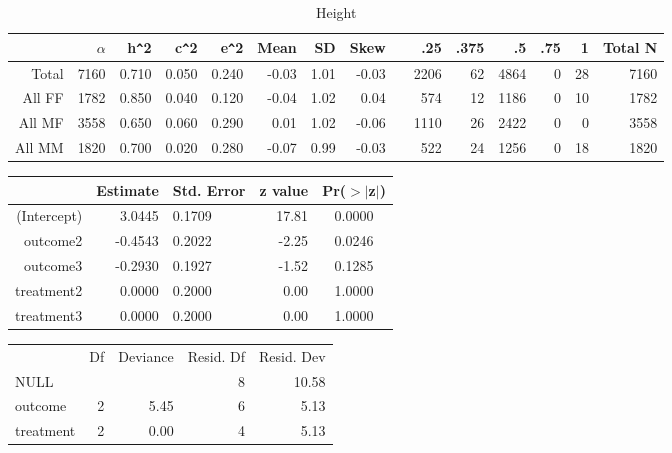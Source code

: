 \documentclass[a4paper]{article}
\begin{document}
\begin{table}[ht]
\begin{center}
\begin{tabular}{rrrrrrrrrrrrrrr}
  \hline
 & $\alpha$ & h\verb|^|2 & c\verb|^|2 & e\verb|^|2 & Mean & SD & Skew &   & .25 & .375 & .5 & .75 & 1 & Total N \\ 
  \hline
Total & 7160 & 0.710 & 0.050 & 0.240 & -0.03 & 1.01 & -0.03 &  & 2206 & 62 & 4864 & 0 & 28 & 7160 \\ 
  All FF & 1782 & 0.850 & 0.040 & 0.120 & -0.04 & 1.02 & 0.04 &  & 574 & 12 & 1186 & 0 & 10 & 1782 \\ 
  All MF & 3558 & 0.650 & 0.060 & 0.290 & 0.01 & 1.02 & -0.06 &  & 1110 & 26 & 2422 & 0 & 0 & 3558 \\ 
  All MM & 1820 & 0.700 & 0.020 & 0.280 & -0.07 & 0.99 & -0.03 &  & 522 & 24 & 1256 & 0 & 18 & 1820 \\ 
   \hline
\end{tabular}
\caption{Height}
\label{tab:two}
\end{center}
\end{table}%
\begin{table}[ht]
\begin{center}
\begin{tabular}{r|rlrc}
  \hline
 & Estimate & Std. Error & z value & Pr($>$$|$z$|$) \\ 
  \hline
(Intercept) & 3.0445 & 0.1709 & 17.81 & 0.0000 \\ 
  outcome2 & -0.4543 & 0.2022 & -2.25 & 0.0246 \\ 
  outcome3 & -0.2930 & 0.1927 & -1.52 & 0.1285 \\ 
  treatment2 & 0.0000 & 0.2000 & 0.00 & 1.0000 \\ 
  treatment3 & 0.0000 & 0.2000 & 0.00 & 1.0000 \\ 
   \hline
\end{tabular}
\end{center}
\end{table}%
\begin{table}[ht]
\begin{center}
{\small
\begin{tabular}{lrrrr}
  & Df & Deviance & Resid. Df & Resid. Dev \\ 
 NULL &  &  & 8 & 10.58 \\ 
   \hline
outcome & 2 & 5.45 & 6 & 5.13 \\ 
  treatment & 2 & 0.00 & 4 & 5.13 \\ 
  \end{tabular}
}
\end{center}
\end{table}
\end{document}
